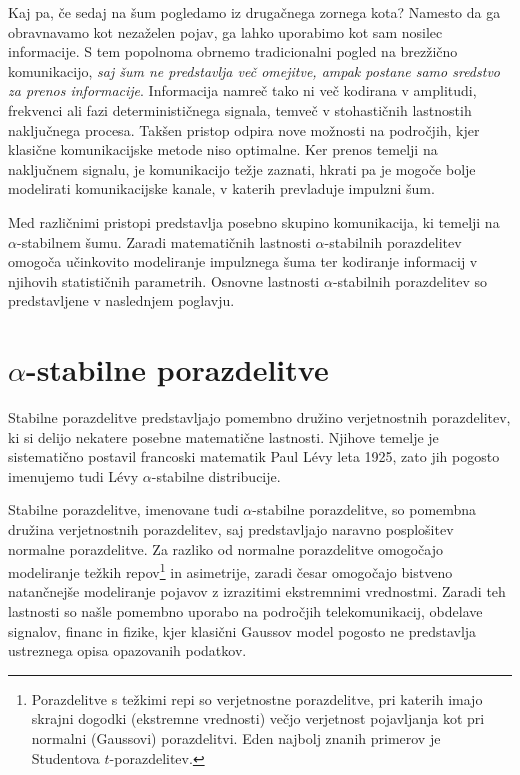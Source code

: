\documentclass[a4paper, 12pt, openany]{book}
\begin{document}
Kaj pa, če sedaj na šum pogledamo iz drugačnega zornega kota? Namesto da ga obravnavamo kot nezaželen pojav, ga lahko uporabimo kot sam nosilec informacije. S tem popolnoma obrnemo tradicionalni pogled na brezžično komunikacijo, \textit{saj šum ne predstavlja več omejitve, ampak postane samo sredstvo za prenos informacije}. %
Informacija namreč tako ni več kodirana v amplitudi, frekvenci ali fazi determinističnega signala, temveč v stohastičnih lastnostih naključnega procesa. Takšen pristop odpira nove možnosti na področjih, kjer klasične komunikacijske metode niso optimalne. Ker prenos temelji na naključnem signalu, je komunikacijo težje zaznati, hkrati pa je mogoče bolje modelirati komunikacijske kanale, v katerih prevladuje impulzni šum.

Med različnimi pristopi predstavlja posebno skupino komunikacija, ki temelji na $\alpha$-stabilnem šumu. Zaradi matematičnih lastnosti $\alpha$-stabilnih porazdelitev omogoča učinkovito modeliranje impulznega šuma ter kodiranje informacij v njihovih statističnih parametrih. Osnovne lastnosti $\alpha$-stabilnih porazdelitev so predstavljene v naslednjem poglavju.


\chapter{$\alpha$-stabilne porazdelitve}
\label{ch1}
Stabilne porazdelitve predstavljajo pomembno družino verjetnostnih porazdelitev, ki si delijo nekatere posebne matematične lastnosti. Njihove temelje je sistematično postavil francoski matematik Paul Lévy leta 1925, zato jih pogosto imenujemo tudi Lévy $\alpha$-stabilne distribucije. 

Stabilne porazdelitve, imenovane tudi $\alpha$-stabilne porazdelitve, so pomembna družina verjetnostnih porazdelitev, saj predstavljajo naravno posplošitev normalne porazdelitve. Za razliko od normalne porazdelitve omogočajo modeliranje težkih repov\footnote{Porazdelitve s težkimi repi so verjetnostne porazdelitve, pri katerih imajo skrajni dogodki (ekstremne vrednosti) večjo verjetnost pojavljanja kot pri normalni (Gaussovi) porazdelitvi. Eden najbolj znanih primerov je Studentova $t$-porazdelitev.} in asimetrije, zaradi česar omogočajo bistveno natančnejše modeliranje pojavov z izrazitimi ekstremnimi vrednostmi. Zaradi teh lastnosti so našle pomembno uporabo na področjih telekomunikacij, obdelave signalov, financ in fizike, kjer klasični Gaussov model pogosto ne predstavlja ustreznega opisa opazovanih podatkov.
\end{document}
